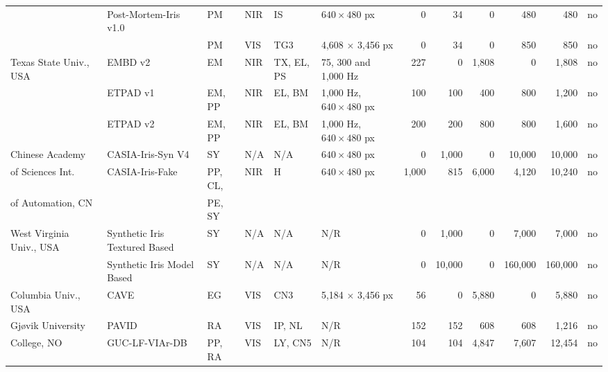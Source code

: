 \documentclass[format=acmsmall, review=false, timestamp=false]{acmart}
\begin{document}
\begin{landscape}
\begin{table}[htb!]
\begin{center}
\begin{threeparttable}
\begin{tabular}{llllllrrrrrc}
            & {\sf Post-Mortem-Iris v1.0} \cite{Trokielewicz_BTAS_2016} \color{blue}{\cite{WARSAW_DBs_URL}}& PM & NIR & IS & $640 \times 480$ px & 0 & 34 & 0 & 480 & 480 & {no} \\ 
            & & PM & VIS & TG3 & 4,608 $\times$ 3,456 px & 0 & 34 & 0 & 850 & 850 & {no} \\ \hline 
            Texas State Univ., USA & {\sf EMBD v2} \cite{Holland_TIFS_2013} & EM & NIR & TX, EL, PS & 75, 300 and 1,000 Hz & 227 & 0 & 1,808 & 0 & 1,808 & {no} \\ 
            & {\sf ETPAD v1} \cite{Rigas_IJCB_2014} \color{blue}{\cite{ETPAD_v1_URL}} & EM, PP & NIR & EL, BM & 1,000 Hz, $640 \times 480$ px & 100 & 100 & 400 & 800 & 1,200 & {no} \\ 
            & {\sf ETPAD v2} \color{blue}{\cite{ETPAD_v2_URL}} & EM, PP & NIR & EL, BM & 1,000 Hz, $640 \times 480$ px & 200 & 200 & 800 & 800 & 1,600 & {no} \\ 
            \hline
            Chinese Academy & {\sf CASIA-Iris-Syn V4} \cite{Wei_ICPR_2008} \color{blue}{\cite{CASIA_IrisSynv4_URL}} & SY & N/A & N/A & $640 \times 480$ px & 0 & 1,000 & 0 & 10,000 & 10,000 & {no} \\   
            of Sciences  Int. & {\sf CASIA-Iris-Fake} \cite{Sun_PAMI_2014} & PP, CL, & NIR & H & $640 \times 480$ px & 1,000 & 815 & 6,000 & 4,120 & 10,240 & {no} \\             
           of Automation, CN & & PE, SY & & & & & & & & \\ 
	   \hline
            West Virginia Univ., USA & {\sf Synthetic Iris Textured Based} \cite{Shah_ICIP_2006} \color{blue}{\cite{WVU_DB1_URL}} & SY & N/A & N/A & N/R & 0 & 1,000 & 0 & 7,000 & 7,000 & {no} \\ 
           & {\sf Synthetic Iris Model Based} \cite{Zuo_TIFS_2007} \color{blue}{\cite{WVU_DB2_URL}} & SY & N/A & N/A & N/R & 0 & 10,000 & 0 & 160,000 & 160,000 & {no} \\
            \hline
            Columbia Univ., USA & {\sf CAVE} \cite{Smith_UIST_2013} \color{blue}{\cite{CAVE_DB_URL}} & EG & VIS & CN3 & 5,184 $\times$ 3,456 px & 56 & 0 & 5,880 & 0 & 5,880 & {no} \\ 
	   \hline   
            Gj\o vik University & {\sf PAVID} \cite{Raja_BTAS_2015} \color{blue}{\cite{GUC_PAVID_DB_URL}} & RA & VIS & IP, NL & N/R & 152 & 152 & 608 & 608 & 1,216 & {no} \\
            College, NO & {\sf GUC-LF-VIAr-DB} \cite{Raghavendra_IJCB_2014} \color{blue}{\cite{GUC_LF_VIAr_DB_URL}} & PP, RA & VIS & LY, CN5 & N/R & 104 & 104 & 4,847 & 7,607 & 12,454 & {no} \\

\end{tabular}
\end{threeparttable}
\end{center}
\end{table}
\end{landscape}
\end{document}

